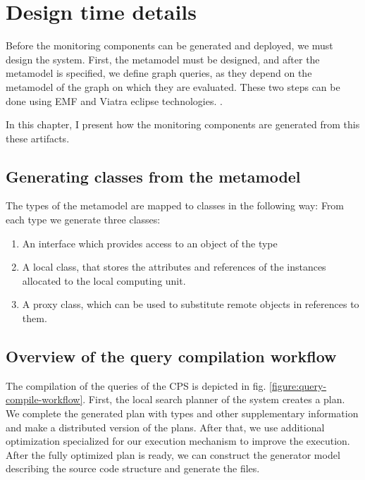 \chapter{Design time details}

Before the monitoring components can be generated and deployed, we must design the system. First, the metamodel must be designed, and after the metamodel is specified, we define graph queries, as they depend on the metamodel of the graph on which they are evaluated. These two steps can be done using EMF and Viatra eclipse technologies. . 

In this chapter, I present how the monitoring components are generated from this these artifacts. 


\section{Generating classes from the metamodel}

The types of the metamodel are mapped to \cpp{} classes in the following way: From each type we generate three \cpp{} classes:

\begin{enumerate}
	\item An interface which provides access to an object of the type
	\item A local class, that stores the attributes and references of the instances allocated to the local computing unit.
	\item A proxy class, which can be used to substitute remote objects in references to them.
\end{enumerate}


\section{Overview of the query compilation workflow}

The compilation of the queries of the CPS is depicted in fig. \ref{figure:query-compile-workflow}. First, the local search planner of the \viatra{} system creates a plan. We complete the generated plan with types and other supplementary information and make a distributed version of the plans. After that, we use additional optimization specialized for our execution mechanism to improve the execution. After the fully optimized plan is ready, we can construct the generator model describing the source code structure and generate the \cpp{} files.

